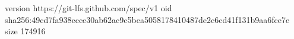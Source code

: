 version https://git-lfs.github.com/spec/v1
oid sha256:49cd7fa938ecce30ab62ac9c5bea5058178410487de2c6cd41f131b9aa6fce7e
size 174916
